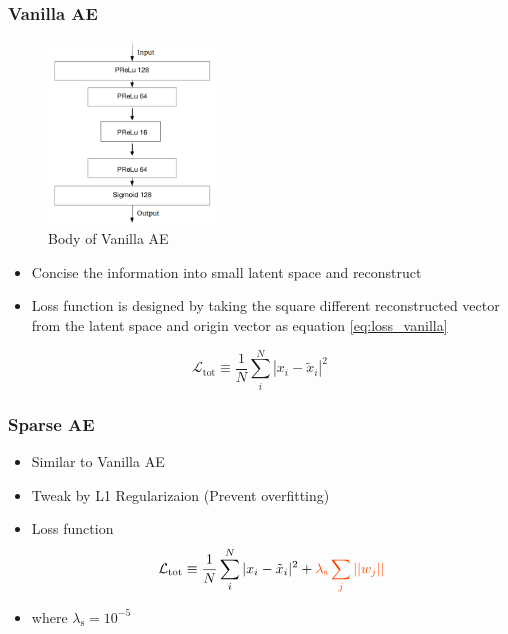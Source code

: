 \subsubsection{Vanilla AE}
\begin{figure}[h!]
    \centering
    \includegraphics[width=0.4\textwidth]{images/vanilla_ae.png}
    \caption{Body of Vanilla AE}
    \label{fig:vanilla_ae}
\end{figure}
\begin{itemize}
    \item Concise the information into small latent space and reconstruct
    \item Loss function is designed by taking the square different reconstructed vector from the latent space and origin vector as equation \ref{eq:loss_vanilla}
\end{itemize}
\begin{equation}\label{eq:loss_vanilla}
    \mathcal{L}_{\text{tot}} \equiv \frac{1}{N}\sum_i^N |x_i-\tilde{x}_i|^2
\end{equation}

\subsubsection{Sparse AE}
\begin{itemize}
    \item Similar to Vanilla AE
    \item Tweak by \textcolor[RGB]{255,69,0}{L1 Regularizaion (Prevent overfitting)}
    \item Loss function
    \begin{equation}
        \mathcal{L}_{\text{tot}} \equiv \frac{1}{N}\sum_i^N |x_i-\tilde{x}_i|^2 + \textcolor[RGB]{255,69,0}{\lambda_{\text{s}}\sum_j||w_j||}
    \end{equation}
    \item where $\lambda_{\text{s}} = 10^{-5}$
\end{itemize}

